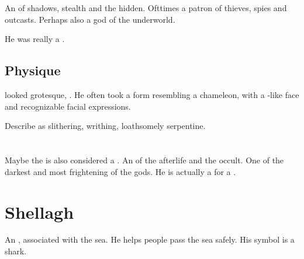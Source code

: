 \section{\Nasshikerr}
\index{\Nasshikerr}
An  of shadows, stealth and the hidden. 
Ofttimes a patron of thieves, spies and outcasts. 
Perhaps also a god of the underworld.

He was really a \quiljaar. 









\subsection{Physique}
\Nasshikerr looked grotesque, .
He often took a form resembling a chameleon, with a \scatha-like face and recognizable facial expressions. 

Describe \Nasshikerr as slithering, writhing, loathsomely serpentine.















\section{\NerrhanKoss}
\index{\NerrhanKoss}
Maybe  the \xs{} is also considered a . 
An  of the afterlife and the occult. 
One of the darkest and most frightening of the \Ortaican{} gods. 
He is actually a  for a \xs. 















\section{Shellagh}
An , associated with the sea. 
He helps people pass the sea safely. 
His symbol is a shark. 

